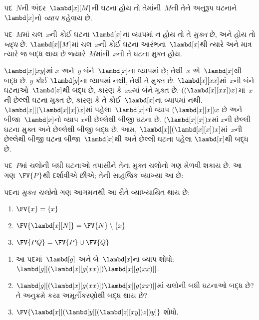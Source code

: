 \begin{defn}[વ્યાપ]
પદ~$N$ની અંદર~$\lambd[x][M]$ની ઘટના હોય તો તેમાંની~$M$ની
તેને અનુરૂપ ઘટનાને~$\lambd[x]$નો \emph{વ્યાપ} કહેવાય છે.
\end{defn}

\begin{defn}[મુક્ત અને બદ્ધ ઘટના]
  પદ~$M$માં ચલ~$x$ની કોઈ ઘટના $\lambd[x]$ના વ્યાપમાં ન હોય તો
  તે \emph{મુક્ત} છે, અને હોય તો \emph{બદ્ધ} છે.
  $\lambd[x][M]$માં ચલ~$x$ની કોઈ ઘટના આરંભના~$\lambd[x]$થી
  ત્યારે અને માત્ર ત્યારે જ બદ્ધ થાય છે જ્યારે~$M$માંની~$x$ની
  તે ઘટના મુક્ત હોય.
\end{defn}

\begin{ex}
  $\lambd[x][x y]$માં $x$ અને~$y$ બંને~$\lambd[x]$ના વ્યાપમાં
  છે; તેથી~$x$ એ~$\lambd[x]$થી બદ્ધ છે. $y$ કોઈ
  $\lambd[y]$ના વ્યાપમાં નથી, તેથી તે મુક્ત છે.
  $\lambd[x][x x]$માં~$x$ની બંને ઘટનાઓ~$\lambd[x]$થી બદ્ધ છે,
  કારણ કે~$xx$માં બંને મુક્ત છે.
  $((\lambd[x][xx])x)$માં~$x$ની છેલ્લી ઘટના મુક્ત છે, કારણ કે
  તે કોઈ~$\lambd[x]$ના વ્યાપમાં નથી.
  $\lambd[x][(\lambd[x][x])x]$માં પહેલા~$\lambd[x]$નો વ્યાપ
  $(\lambd[x][x])x$ છે અને બીજા~$\lambd[x]$નો વ્યાપ
  $x$ની છેલ્લેથી બીજી ઘટના છે. $(\lambd[x][x])x$માં
  $x$ની છેલ્લી ઘટના મુક્ત અને છેલ્લેથી બીજી બદ્ધ છે.
  આમ, $\lambd[x][(\lambd[x][x])x]$માં~$x$ની છેલ્લેથી બીજી
  ઘટના બીજા~$\lambd[x]$થી અને છેલ્લી ઘટના પહેલા
  $\lambd[x]$થી બદ્ધ છે.
\end{ex}

પદ~$P$માં ચલોની બધી ઘટનાઓ તપાસીને તેના મુક્ત ચલોનો ગણ
મેળવી શકાય છે. આ ગણ~$\FV{P}$થી દર્શાવીએ છીએ; તેની સાહજિક
વ્યાખ્યા આ છે:

\begin{defn}[પદના મુક્ત ચલો] 
  પદના \emph{મુક્ત ચલો}નો ગણ આગમનથી આ રીતે વ્યાખ્યાયિત થાય છે:
  \begin{enumerate}
    \item $\FV{x} = \{x\}$ 
    \item $\FV{\lambd[x][N]} = \FV{N} \setminus \{x\}$    
    \item $\FV{PQ} = \FV{P} \cup \FV{Q}$ 
  \end{enumerate}
\end{defn}

\begin{prob}
  \begin{enumerate}
  \item આ પદમાં~$\lambd[g]$ અને બે~$\lambd[x]$ના વ્યાપ શોધો:
    $\lambd[g][(\lambd[x][g (x x)]) \lambd[x][g (x x)]]$.
  \item $\lambd[g][(\lambd[x][g (x x)]) \lambd[x][g (x x)]]$માં
    ચલોની બધી ઘટનાઓ બદ્ધ છે? તે અનુક્રમે કયા અમૂર્તીકરણોથી
    બદ્ધ થાય છે?
    \item $\FV{\lambd[x][(\lambd[y][(\lambd[z][x y]) z]) y]}$
    શોધો.
  \end{enumerate}
\end{prob}

